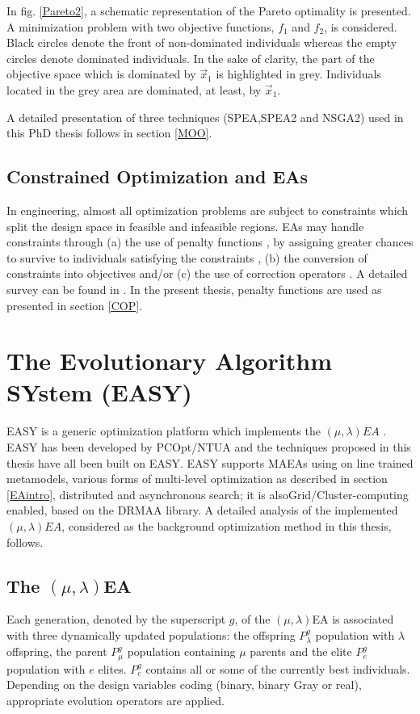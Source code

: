 In fig. \ref{Pareto2}, a schematic representation of the Pareto optimality is presented. A minimization problem with two objective functions, $f_1$ and $f_2$, is considered. Black circles denote the front of non-dominated individuals whereas the empty circles denote dominated individuals. In the sake of clarity, the part of the objective space which is dominated by $\vec{x}_1$ is highlighted in grey. Individuals located in the grey area are dominated, at least, by $\vec{x}_1$. 

A detailed presentation of three techniques (SPEA,SPEA2 and NSGA2) used in this PhD thesis follows in section \ref{MOO}.

\subsection{Constrained Optimization and EAs}
\label{COPini}
In engineering, almost all optimization problems are subject to constraints which split the design space in feasible and infeasible regions. EAs may handle constraints through (a) the use of penalty functions \cite{Deb00,morales98}, by assigning greater chances to survive to individuals satisfying the constraints \cite{powell93}, (b) the conversion of constraints into objectives \cite{surry95,surry97} and/or (c) the use of correction operators \cite{mich94}. A detailed survey can be found in \cite{mich96,coello02}. In the present thesis, penalty functions are used as presented in section \ref{COP}. 

\section{The Evolutionary Algorithm SYstem (EASY)}
\label{EASY_def}
EASY is a generic optimization platform which implements the $(\mu,\lambda)EA$ \cite{phd_Giotis,phd_Karakasis,phd_Kampolis,EASYsite}. EASY has been developed by PCOpt/NTUA and the techniques proposed in this thesis have all been built on EASY. EASY supports MAEAs using on line trained metamodels, various forms of multi-level optimization as described in section \ref{EAintro}, distributed and asynchronous search; it is alsoGrid/Cluster-computing enabled, based on the DRMAA library. A detailed analysis of the implemented $(\mu,\lambda)EA$, considered as the background optimization method in this thesis, follows.  


\subsection{The $(\mu,\lambda)$EA}
\label{MLEA}
Each generation, denoted by the superscript $g$, of the $(\mu,\lambda)$EA is associated with three dynamically updated populations: the offspring $P_{\lambda}^g$ population with $\lambda$ offspring, the parent $P_{\mu}^g$ population containing $\mu$ parents and the elite $P_{e}^g$ population with $e$ elites. $P_{e}^g$ contains all or some of the currently best individuals. Depending on the design variables coding (binary, binary Gray or real), appropriate evolution operators are applied. 

